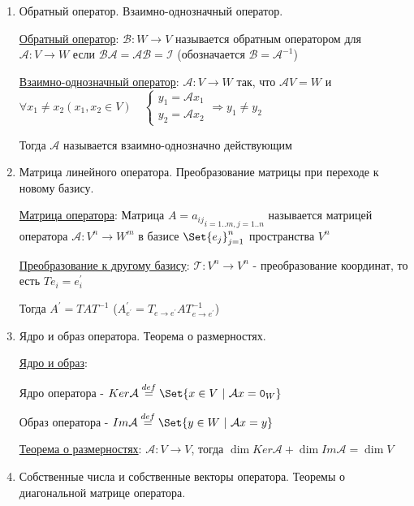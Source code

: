 \documentclass[12pt]{article}
\begin{document}
\begin{enumerate}
        \item Обратный оператор. Взаимно-однозначный оператор.

        \hyperlink{reverselinearoperator}{Обратный оператор}: $\mathcal{B} : W \rightarrow V$ называется обратным оператором для $\mathcal{A} : V \rightarrow W$
        если $\mathcal{B}\mathcal{A} = \mathcal{A}\mathcal{B} = \mathcal{I}$ (обозначается $\mathcal{B} = \mathcal{A}^{-1}$)

        \hyperlink{onetoonelinearoperator}{Взаимно-однозначный оператор}: $\mathcal{A} : V \rightarrow W$ так, что $\mathcal{A}V = W$ и $\forall x_1 \neq x_2 (x_1, x_2 \in V) \quad
        \begin{cases}y_1 = \mathcal{A}x_1 \\ y_2 = \mathcal{A}x_2\end{cases} \Longrightarrow y_1 \neq y_2$

        Тогда $\mathcal{A}$ называется взаимно-однозначно действующим

        \item Матрица линейного оператора. Преобразование матрицы при переходе к новому базису.

        \hyperlink{operatorsmatrix}{Матрица оператора}: Матрица $A = {a_{ij}}_{i=1..m, j=1..n}$ называется матрицей оператора $\mathcal{A} : V^n \rightarrow W^m$ в базисе $\Set{e_j}^n_{j=1}$ пространства $V^n$

        \hyperlink{transformationtodifferentbasis}{Преобразование к другому базису}:     $\mathcal{T} : V^n \rightarrow V^n$ - преобразование координат, то есть $Te_i = e^\prime_i$

        Тогда $A^\prime = TAT^{-1}$ ($A^\prime_{e^\prime} = T_{e\to e^\prime}AT^{-1}_{e\to e^\prime}$)

        \item Ядро и образ оператора. Теорема о размерностях.

        \hyperlink{kernalandimageofoperator}{Ядро и образ}:

        Ядро оператора - $Ker \mathcal{A} \stackrel{def}{=} \Set{x \in V \ | \ \mathcal{A}x = \texttt{0}_W}$

        Образ оператора - $Im \mathcal{A} \stackrel{def}{=} \Set{y \in W \ | \ \mathcal{A}x = y}$

        \hyperlink{theoremaboutdimensions}{Теорема о размерностях}: $\mathcal{A} : V \rightarrow V$, тогда $\dim Ker \mathcal{A} + \dim Im \mathcal{A} = \dim V$


        \item Собственные числа и собственные векторы оператора. Теоремы о диагональной матрице оператора.


\end{enumerate}
\end{document}

